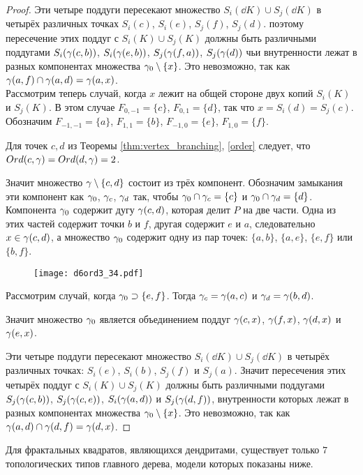 \begin{proof}
Эти четыре поддуги пересекают множество $S_i(\dd K)\cup S_j(\dd K)$ в четырёх различных точках $S_i(c)$, $S_i(e)$, $S_j(f)$, $S_j(d)$. 
поэтому пересечение этих поддуг с $S_i( K)\cup S_j(K)$ должны быть различными поддугами $S_i(\gamma(c,b))$,  $S_i(\gamma(e,b))$, $S_j(\gamma(f,a))$, $S_j(\gamma(d))$ чьи внутренности лежат в разных компонентах множества $\gamma_0\setminus\{x\}$. 
Это невозможно, так как $\gamma(a,f)\cap\gamma(a,d)=\gamma(a,x)$.\\

Рассмотрим теперь случай, когда $x$ лежит на общей стороне двух копий $S_i(K)$ и $S_j(K)$. 
В этом случае $F_{0,-1}=\{c\}$, $F_{0,1}=\{d\}$, так что $x=S_i(d)=S_j(c)$.  
Обозначим $F_{-1,-1}=\{a\}$, $F_{1 ,1}=\{b\}$, $F_{-1,0}=\{e\}$, $F_{1,0}=\{f\}$.

Для точек $c,d$ из Теоремы \ref{thm:vertex_branching}, \ref{order} следует, что $Ord(c,\gamma)=Ord(d,\gamma)=2$. 

Значит множество $\gamma\setminus\{c,d\}$  состоит из трёх компонент. 
Обозначим замыкания эти компонент как $\gamma_0$, $\gamma_c$, $\gamma_d$ так, чтобы $\gamma_0\cap\gamma_c=\{c\}$ и $\gamma_0\cap \gamma_d=\{d\}$. 
Компонента $\gamma_0$ содержит дугу $\gamma(c,d)$, которая делит $P$ на две части. 
Одна из этих частей содержит точки $b$ и $f$, другая содержит $e$ и $a$, следовательно $x\in \gamma(c,d)$, а множество $\gamma_0$ содержит одну из пар точек: $\{a,b\}$, $\{a,e\}$, $\{e,f\}$ или $\{b,f\}$. 

\begin{figure}[H]
    \centering
    \texttt{[image: d6ord3\_34.pdf]}
\end{figure}

Рассмотрим случай, когда $\gamma_0\supset\{e,f\}$. 
Тогда $\gamma_c=\gamma(a,c)$ и $\gamma_d=\gamma(b,d)$.

Значит множество $\gamma_0$ является объединением поддуг  $\gamma(c,x)$, $\gamma(f,x)$, $\gamma(d,x)$ и $\gamma(e,x)$.

Эти четыре поддуги пересекают множество $S_i(\dd K)\cup S_j(\dd K)$ в четырёх различных точках: $S_i(e)$, $S_i(b)$, $S_j(f)$ и $S_j(a)$. 
Значит пересечения этих четырёх поддуг с $S_i( K)\cup S_j(K)$ должны быть различными поддугами $S_j(\gamma(c,b))$, $S_j(\gamma(c,e))$, $S_i(\gamma(a,d))$ и $S_j(\gamma(d,f))$, внутренности которых лежат в разных компонентах множества $\gamma_0\setminus\{x\}$. 
Это невозможно, так как $\gamma(a,d)\cap\gamma(d,f)=\gamma(d,x)$.
\end{proof}

\begin{theorem}\label{thm:7trees}
Для фрактальных квадратов, являющихся дендритами, существует только $7$ топологических типов главного дерева, модели которых показаны ниже.
\end{theorem}

